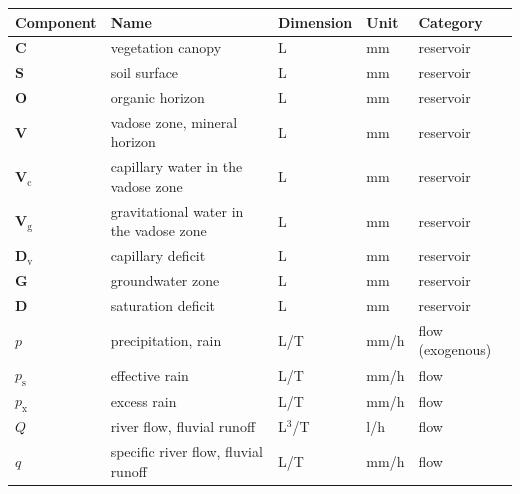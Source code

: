 \documentclass[./main_en.tex]{subfiles}
\begin{document}
{\renewcommand{\arraystretch}{1.5}%
\begin{table}[t!]
    \centering	
    \tiny
    \sffamily
    \begin{tabular}{ 
        >{\raggedright\arraybackslash}m{1cm}  
        >{\raggedright\arraybackslash}m{6cm}  
        >{\raggedright\arraybackslash}m{1cm}
        >{\raggedright\arraybackslash}m{1cm}
        >{\raggedright\arraybackslash}m{2cm}}
        \toprule
        \textbf{Component} & \textbf{Name} & \textbf{Dimension} & \textbf{Unit} & \textbf{Category} \\ 
        \midrule
        
        $\textbf{C}$ & vegetation canopy & L & mm & reservoir \\ 
        $\textbf{S}$ & soil surface & L & mm & reservoir \\ 
        $\textbf{O}$ & organic horizon & L & mm & reservoir \\ 
        $\textbf{V}$ & vadose zone, mineral horizon & L & mm & reservoir \\
        $\textbf{V}_{\text{c}}$ & capillary water in the vadose zone & L & mm & reservoir \\
        $\textbf{V}_{\text{g}}$ & gravitational water in the vadose zone & L & mm & reservoir \\
        $\textbf{D}_\text{v}$ & capillary deficit & L & mm & reservoir \\
        $\textbf{G}$ & groundwater zone & L & mm & reservoir \\
        $\textbf{D}$ & saturation deficit & L & mm & reservoir \\
        
        $p$ & precipitation, rain & L/T & mm/h & flow (exogenous)\\
        $p_{\text{s}}$ & effective rain & L/T & mm/h & flow\\
        $p_{\text{x}}$ & excess rain & L/T & mm/h & flow\\
        
        $Q$ & river flow, fluvial runoff & L$^{3}$/T & l/h & flow\\
        $q$ & specific river flow, fluvial runoff & L/T & mm/h & flow\\
        

\end{tabular}
\end{table}}
\end{document}
